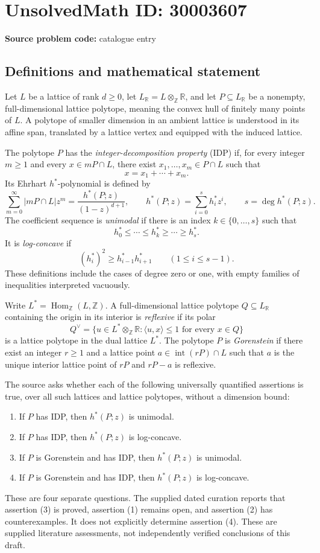 \documentclass[11pt]{article}
\newcommand{\Z}{\mathbb{Z}}
\newcommand{\R}{\mathbb{R}}
\begin{document}
\section*{UnsolvedMath ID: 30003607}
\textbf{Source problem code:} catalogue entry
\subsection{Definitions and mathematical statement}
Let \(L\) be a lattice of rank \(d\geq 0\), let \(L_{\R}=L\otimes_{\Z}\R\), and let \(P\subseteq L_{\R}\) be a nonempty, full-dimensional lattice polytope, meaning the convex hull of finitely many points of \(L\). A polytope of smaller dimension in an ambient lattice is understood in its affine span, translated by a lattice vertex and equipped with the induced lattice.

The polytope \(P\) has the \emph{integer-decomposition property} (IDP) if, for every integer \(m\geq 1\) and every \(x\in mP\cap L\), there exist \(x_1,\ldots,x_m\in P\cap L\) such that
\[
 x=x_1+\cdots+x_m.
\]
Its Ehrhart \(h^*\)-polynomial is defined by
\[
 \sum_{m=0}^{\infty}\lvert mP\cap L\rvert z^m
 =\frac{h^*(P;z)}{(1-z)^{d+1}},
 \qquad
 h^*(P;z)=\sum_{i=0}^{s}h_i^*z^i,
 \qquad s=\deg h^*(P;z).
\]
The coefficient sequence is \emph{unimodal} if there is an index \(k\in\{0,\ldots,s\}\) such that
\[
 h_0^*\leq\cdots\leq h_k^*\geq\cdots\geq h_s^*.
\]
It is \emph{log-concave} if
\[
 (h_i^*)^2\geq h_{i-1}^*h_{i+1}^*
 \qquad(1\leq i\leq s-1).
\]
These definitions include the cases of degree zero or one, with empty families of inequalities interpreted vacuously.

Write \(L^*=\operatorname{Hom}_{\Z}(L,\Z)\). A full-dimensional lattice polytope \(Q\subseteq L_{\R}\) containing the origin in its interior is \emph{reflexive} if its polar
\[
 Q^{\vee}=\{u\in L^*\otimes_{\Z}\R:\langle u,x\rangle\leq 1\text{ for every }x\in Q\}
\]
is a lattice polytope in the dual lattice \(L^*\). The polytope \(P\) is \emph{Gorenstein} if there exist an integer \(r\geq 1\) and a lattice point \(a\in\operatorname{int}(rP)\cap L\) such that \(a\) is the unique interior lattice point of \(rP\) and \(rP-a\) is reflexive.

The source asks whether each of the following universally quantified assertions is true, over all such lattices and lattice polytopes, without a dimension bound:
\begin{enumerate}
\item If \(P\) has IDP, then \(h^*(P;z)\) is unimodal.
\item If \(P\) has IDP, then \(h^*(P;z)\) is log-concave.
\item If \(P\) is Gorenstein and has IDP, then \(h^*(P;z)\) is unimodal.
\item If \(P\) is Gorenstein and has IDP, then \(h^*(P;z)\) is log-concave.
\end{enumerate}
These are four separate questions. The supplied dated curation reports that assertion (3) is proved, assertion (1) remains open, and assertion (2) has counterexamples. It does not explicitly determine assertion (4). These are supplied literature assessments, not independently verified conclusions of this draft.
\end{document}

